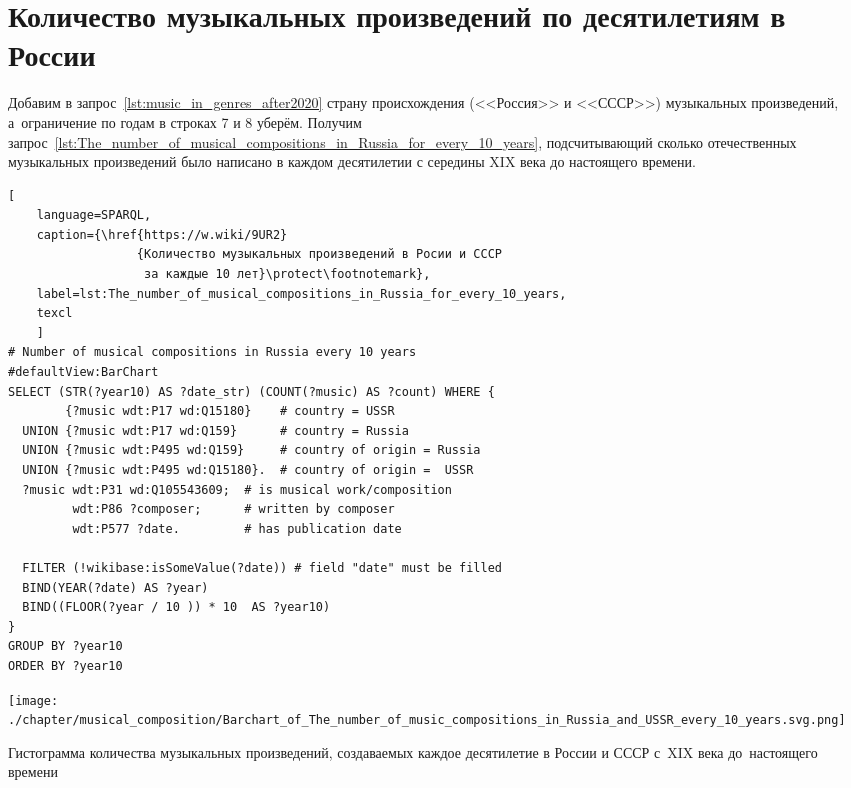 \section{Количество музыкальных произведений по десятилетиям в России}

Добавим в запрос~\ref{lst:music_in_genres_after2020} страну происхождения (<<Россия>> и <<СССР>>) 
музыкальных произведений, а~ограничение по годам в строках 7 и 8 уберём. 
Получим запрос~\ref{lst:The_number_of_musical_compositions_in_Russia_for_every_10_years}, 
подсчитывающий сколько отечественных музыкальных произведений было написано 
в каждом десятилетии с середины XIX века до настоящего времени.

\begin{lstlisting}[ 
    language=SPARQL,
    caption={\href{https://w.wiki/9UR2}
                  {Количество музыкальных произведений в Росии и СССР 
                   за каждые 10 лет}\protect\footnotemark},
    label=lst:The_number_of_musical_compositions_in_Russia_for_every_10_years,
    texcl 
    ]
# Number of musical compositions in Russia every 10 years
#defaultView:BarChart
SELECT (STR(?year10) AS ?date_str) (COUNT(?music) AS ?count) WHERE {
        {?music wdt:P17 wd:Q15180}    # country = USSR
  UNION {?music wdt:P17 wd:Q159}      # country = Russia
  UNION {?music wdt:P495 wd:Q159}     # country of origin = Russia
  UNION {?music wdt:P495 wd:Q15180}.  # country of origin =  USSR
  ?music wdt:P31 wd:Q105543609;  # is musical work/composition
         wdt:P86 ?composer;      # written by composer
         wdt:P577 ?date.         # has publication date

  FILTER (!wikibase:isSomeValue(?date)) # field "date" must be filled
  BIND(YEAR(?date) AS ?year)
  BIND((FLOOR(?year / 10 )) * 10  AS ?year10)
}
GROUP BY ?year10
ORDER BY ?year10
\end{lstlisting}%



\newpage

\begin{marginfigure}[0\baselineskip]
	\texttt{[image: ./chapter/musical\_composition/Barchart\_of\_The\_number\_of\_music\_compositions\_in\_Russia\_and\_USSR\_every\_10\_years.svg.png]}
    \vspace{-7pt}
	\caption{Гистограмма количества музыкальных произведений, 
             создаваемых каждое десятилетие в России и СССР с~XIX века до~настоящего времени}%
	\label{fig:diagram_10_yearsRussia}%

\end{marginfigure}

